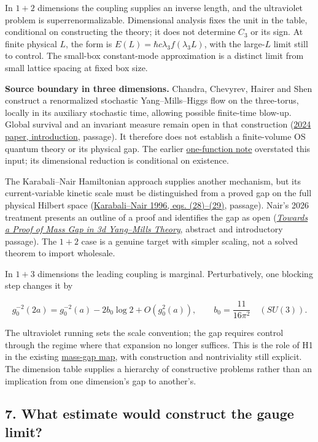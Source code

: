 \documentclass[11pt,a4paper]{article}
\begin{document}
In \(1+2\) dimensions the coupling supplies an inverse length, and the
ultraviolet problem is superrenormalizable. Dimensional analysis fixes
the unit in the table, conditional on constructing the theory; it does
not determine \(C_3\) or its sign. At finite physical \(L\), the form is
\(E(L)=\hbar c\lambda_3 f(\lambda_3L)\), with the large-\(L\) limit
still to control. The small-box constant-mode approximation is a
distinct limit from small lattice spacing at fixed box size.

\textbf{Source boundary in three dimensions.} Chandra, Chevyrev, Hairer
and Shen construct a renormalized stochastic Yang--Mills--Higgs flow on
the three-torus, locally in its auxiliary stochastic time, allowing
possible finite-time blow-up. Global survival and an invariant measure
remain open in that construction
(\href{https://arxiv.org/pdf/2201.03487}{2024 paper, introduction},
passage). It therefore does not establish a finite-volume OS quantum
theory or its physical gap. The earlier
\href{three-dimensional-gap-one-function.md}{one-function note}
overstated this input; its dimensional reduction is conditional on
existence.

The Karabali--Nair Hamiltonian approach supplies another mechanism, but
its current-variable kinetic scale must be distinguished from a proved
gap on the full physical Hilbert space
(\href{https://arxiv.org/pdf/hep-th/9602155}{Karabali--Nair 1996, eqs.
(28)--(29)}, passage). Nair's 2026 treatment presents an outline of a
proof and identifies the gap as open
(\href{https://arxiv.org/abs/2608.10133}{\emph{Towards a Proof of Mass
Gap in 3d Yang--Mills Theory}}, abstract and introductory passage). The
\(1+2\) case is a genuine target with simpler scaling, not a solved
theorem to import wholesale.

In \(1+3\) dimensions the leading coupling is marginal. Perturbatively,
one blocking step changes it by

\[g_0^{-2}(2a)=g_0^{-2}(a)-2b_0\log2+O(g_0^2(a)),
\qquad b_0=\frac{11}{16\pi^2}\quad(SU(3)).\]

The ultraviolet running sets the scale convention; the gap requires
control through the regime where that expansion no longer suffices. This
is the role of H1 in the existing
\href{mass-gap-conditional-theorem.md}{mass-gap map}, with construction
and nontriviality still explicit. The dimension table supplies a
hierarchy of constructive problems rather than an implication from one
dimension's gap to another's.

\hypertarget{what-estimate-would-construct-the-gauge-limit}{%
\subsection{7. What estimate would construct the gauge
limit?}\label{what-estimate-would-construct-the-gauge-limit}}
\end{document}
